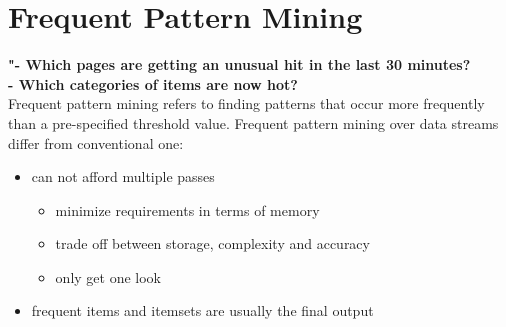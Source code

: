 \documentclass[a3paper, 12pt]{book} %
\begin{document}
\chapter{Frequent Pattern Mining}
\large{\textbf{"- Which pages are getting an unusual hit in the last 30 minutes? \\
		   \indent- Which categories of items are now hot?}}\\


Frequent pattern mining refers to finding patterns that occur more frequently than a pre-specified threshold value. Frequent pattern mining over data streams differ from conventional one:
\begin{itemize}
	\item can not afford multiple passes 
	\begin{itemize}
		\item minimize requirements in terms of memory
		\item trade off between storage, complexity and accuracy
		\item only get one look
	\end{itemize}
	\item frequent items and itemsets are usually the final output
\end{itemize}
\end{document}
